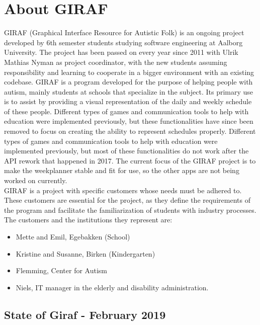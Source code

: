 \section{About GIRAF}
GIRAF (Graphical Interface Resource for Autistic Folk) is an ongoing project developed by 6th semester students studying software engineering at Aalborg University. 
The project has been passed on every year since 2011 with Ulrik Mathias Nyman as project coordinator, with the new students assuming responsibility and learning to cooperate in a bigger environment with an existing codebase. 
GIRAF is a program developed for the purpose of helping people with autism, mainly students at schools that specialize in the subject.
Its primary use is to assist by providing a visual representation of the daily and weekly schedule of these people.
Different types of games and communication tools to help with education were implemented previously, but these functionalities have since been removed to focus on creating the ability to represent schedules properly.
Different types of games and communication tools to help with education were implemented previously, but most of these functionalities do not work after the API rework that happened in 2017. The current focus of the GIRAF project is to make the weekplanner stable and fit for use, so the other apps are not being worked on currently. 
\\
GIRAF is a project with specific customers whose needs must be adhered to. 
These customers are essential for the project, as they define the requirements of the program and facilitate the familiarization of students with industry processes.
The customers and the institutions they represent are: 
\begin{itemize}
    \item Mette and Emil, Egebakken (School)
    \item Kristine and Susanne, Birken (Kindergarten)
    \item Flemming, Center for Autism
    \item Niels, IT manager in the elderly and disability administration.
\end{itemize}

\subsection{State of Giraf - February 2019}
